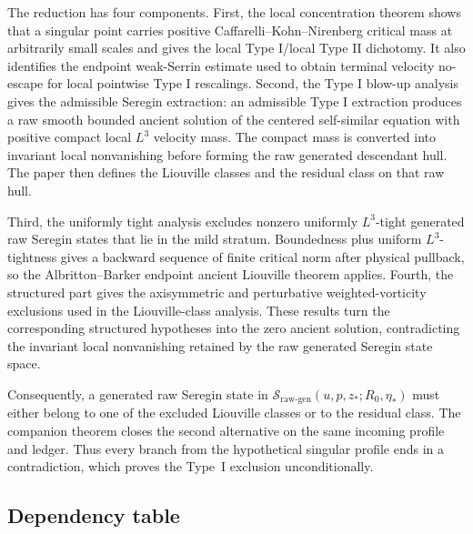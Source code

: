\documentclass[11pt]{amsart}
\theoremstyle{plain}
\theoremstyle{definition}
\theoremstyle{remark}
\numberwithin{equation}{section}
\newcommand{\calS}{\mathcal S}
\begin{document}
The reduction has four components.  First, the local concentration theorem
shows that a singular point carries positive Caffarelli--Kohn--Nirenberg
critical mass at arbitrarily small scales and gives the local Type I/local Type
II dichotomy.  It also identifies the endpoint weak-Serrin estimate used to
obtain terminal velocity no-escape for local pointwise Type I rescalings.
Second, the Type I blow-up analysis gives the admissible Seregin extraction:
an admissible Type I extraction produces a raw smooth bounded ancient solution
of the centered self-similar equation with positive compact local \(L^3\)
velocity mass.  The compact mass is converted into invariant local
nonvanishing before forming the raw generated descendant hull.  The paper then
defines the Liouville classes and the residual class on that raw hull.

Third, the uniformly tight analysis excludes nonzero uniformly \(L^3\)-tight
generated raw Seregin states that lie in the mild stratum.  Boundedness plus uniform
\(L^3\)-tightness gives a backward sequence of finite critical norm after
physical pullback, so the Albritton--Barker endpoint ancient Liouville theorem
applies.  Fourth, the structured part gives the axisymmetric and
perturbative weighted-vorticity exclusions used in the Liouville-class analysis.
These results turn the corresponding structured hypotheses into the zero
ancient solution, contradicting the invariant local nonvanishing retained by
the raw generated Seregin state space.

Consequently, a generated raw Seregin state in
\(\calS_{\mathrm{raw\text{-}gen}}(u,p,z_*;R_0,\eta_*)\) must either belong to one of the excluded
Liouville classes or to the residual class.  The companion theorem closes the
second alternative on the same incoming profile and ledger.  Thus every branch
from the hypothetical singular profile ends in a contradiction, which proves
the Type~I exclusion unconditionally.

\subsection*{Dependency table}
\end{document}
